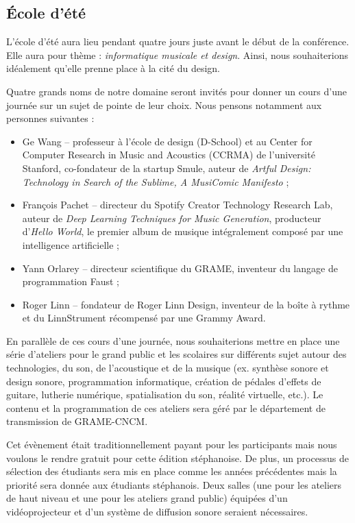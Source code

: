 \documentclass[fontsize=12pt]{scrartcl} %
\numberwithin{equation}{section} %
\numberwithin{figure}{section} %
\numberwithin{table}{section} %
\begin{document}
\subsection{École d'été}

L'école d'été aura lieu pendant quatre jours juste avant le début de la conférence. Elle aura pour thème : \textit{informatique musicale et design}. Ainsi, nous souhaiterions idéalement qu'elle prenne place à la cité du design. 

Quatre grands noms de notre domaine seront invités pour donner un cours d'une journée sur un sujet de pointe de leur choix. Nous pensons notamment aux personnes suivantes :

\begin{itemize}
  \item Ge Wang -- professeur à l'école de design (D-School) et au Center for Computer Research in Music and Acoustics (CCRMA) de l'université Stanford, co-fondateur de la startup Smule, auteur de \textit{Artful Design: Technology in Search of the Sublime, A MusiComic Manifesto} ;
  \item François Pachet -- directeur du Spotify Creator Technology Research Lab, auteur de \textit{Deep Learning Techniques for Music Generation}, producteur d'\textit{Hello World}, le premier album de musique intégralement composé par une intelligence artificielle ;
  \item Yann Orlarey -- directeur scientifique du GRAME, inventeur du langage de programmation Faust ;
  \item Roger Linn -- fondateur de Roger Linn Design, inventeur de la boîte à rythme et du LinnStrument récompensé par une Grammy Award.
\end{itemize} 

En parallèle de ces cours d'une journée, nous souhaiterions mettre en place une série d'ateliers pour le grand public et les scolaires sur différents sujet autour des technologies, du son, de l'acoustique et de la musique (ex. synthèse sonore et design sonore, programmation informatique, création de pédales d'effets de guitare, lutherie numérique, spatialisation du son, réalité virtuelle, etc.). Le contenu et la programmation de ces ateliers sera géré par le département de transmission de GRAME-CNCM. 

Cet évènement était traditionnellement payant pour les participants mais nous voulons le rendre gratuit pour cette édition stéphanoise. De plus, un processus de sélection des étudiants sera mis en place comme les années précédentes mais la priorité sera donnée aux étudiants stéphanois. Deux salles (une pour les ateliers de haut niveau et une pour les ateliers grand public) équipées d'un vidéoprojecteur et d'un système de diffusion sonore seraient nécessaires.
\end{document}
